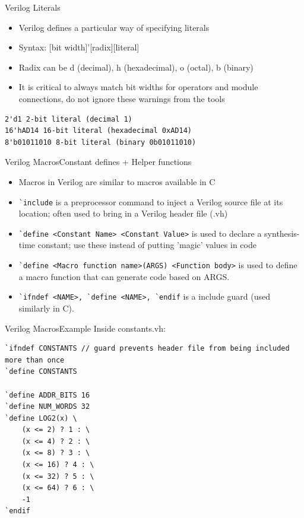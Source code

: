 \documentclass{beamer}
\begin{document}
\begin{frame}[fragile]{Verilog Literals}
	\begin{itemize}
		\item Verilog defines a particular way of specifying literals
		\item Syntax: [bit width]'[radix][literal]
		\item Radix can be d (decimal), h (hexadecimal), o (octal), b (binary)
		\item It is critical to always match bit widths for operators and module connections, do not ignore these warnings from the tools
	\end{itemize}
\begin{verbatim}
2'd1 2-bit literal (decimal 1)
16'hAD14 16-bit literal (hexadecimal 0xAD14)
8'b01011010 8-bit literal (binary 0b01011010)
\end{verbatim}
\end{frame}

\begin{frame}{Verilog Macros}{Constant defines + Helper functions}
	\begin{itemize}
		\item Macros in Verilog are similar to macros available in C
		\item \texttt{\`{}include} is a preprocessor command to inject a Verilog source file at its location; often used to bring in a Verilog header file (.vh)
		\item \texttt{\`{}define <Constant Name> <Constant Value>} is used to declare a synthesis-time constant; use these instead of putting 'magic' values in code
		\item \texttt{\`{}define <Macro function name>(ARGS) <Function body>} is used to define a macro function that can generate code based on ARGS.
		\item \texttt{\`{}ifndef <NAME>, \`{}define <NAME>, \`{}endif} is a include guard (used similarly in C).
	\end{itemize}
\end{frame}

\begin{frame}[fragile]{Verilog Macros}{Example}
Inside constants.vh:
\begin{verbatim}
`ifndef CONSTANTS // guard prevents header file from being included more than once
`define CONSTANTS

`define ADDR_BITS 16
`define NUM_WORDS 32
`define LOG2(x) \
	(x <= 2) ? 1 : \
	(x <= 4) ? 2 : \
	(x <= 8) ? 3 : \
	(x <= 16) ? 4 : \
	(x <= 32) ? 5 : \
	(x <= 64) ? 6 : \
	-1
`endif
\end{verbatim}
\end{frame}
\end{document}
